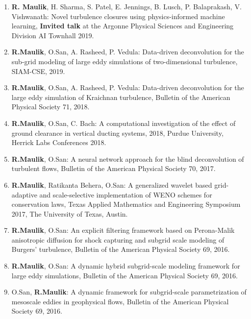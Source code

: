 \documentclass[letterpaper]{article}
\begin{document}
\begin{enumerate}
\item \textbf{R. Maulik}, H. Sharma, S. Patel, E. Jennings, B. Lusch, P. Balaprakash, V. Vishwanath: Novel turbulence closures using physics-informed machine learning, \textbf{Invited talk} at the Argonne Physical Sciences and Engineering Division AI Townhall 2019. 

\item \textbf{R.Maulik}, O.San, A. Rasheed, P. Vedula: Data-driven deconvolution for the sub-grid modeling of large eddy simulations of two-dimensional turbulence, SIAM-CSE, 2019.

\item \textbf{R.Maulik}, O.San, A. Rasheed, P. Vedula: Data-driven deconvolution for the large eddy simulation of Kraichnan turbulence, Bulletin of the American Physical Society 71, 2018.

\item \textbf{R.Maulik}, O.San, C. Bach: A computational investigation of the effect of ground clearance in vertical ducting systems, 2018, Purdue University, Herrick Labs Conferences 2018. 

\item \textbf{R.Maulik}, O.San: A neural network approach for the blind deconvolution of turbulent flows, Bulletin of the American Physical Society 70, 2017.

\item \textbf{R.Maulik}, Ratikanta Behera, O.San: A generalized wavelet based grid-adaptive and scale-selective
implementation of WENO schemes for conservation laws, Texas Applied Mathematics and Engineering Symposium 2017, The University of Texas, Austin.

\item \textbf{R.Maulik}, O.San: An explicit filtering framework based on Perona-Malik anisotropic diffusion for shock capturing and subgrid scale modeling of Burgers' turbulence,  Bulletin of the American Physical Society 69, 2016.

\item \textbf{R.Maulik}, O.San:  A dynamic hybrid subgrid-scale modeling framework for large eddy simulations,  Bulletin of the American Physical Society 69, 2016.

\item O.San, \textbf{R.Maulik}: A dynamic framework for subgrid-scale parametrization of mesoscale eddies in geophysical flows, Bulletin of the American Physical Society 69, 2016.

\end{enumerate}
\end{document}
